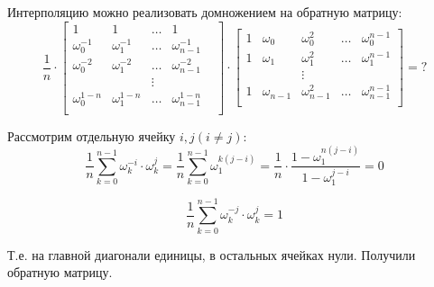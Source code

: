 Интерполяцию можно реализовать домножением на обратную матрицу:
\[
    \frac{1}{n}
    \cdot
    \begin{bmatrix}
        1 & 1 & \ldots & 1 \\
        \omega_0^{-1} & \omega_1^{-1} & \ldots & \omega_{n - 1}^{-1} \\
        \omega_0^{-2} & \omega_1^{-2} & \ldots & \omega_{n - 1}^{-2} \\
        & & \vdots & & \\
        \omega_0^{1 - n} & \omega_1^{1 - n} & \ldots & \omega_{n - 1}^{1 - n} \\
    \end{bmatrix}
    \cdot
    \begin{bmatrix}
        1 & \omega_0 & \omega_0^2 & \ldots & \omega_0^{n - 1} \\
        1 & \omega_1 & \omega_1^2 & \ldots & \omega_1^{n - 1} \\
        & & \vdots & & \\
        1 & \omega_{n - 1} & \omega_{n - 1}^2 & \ldots & \omega_{n - 1}^{n - 1} \\
    \end{bmatrix}
    = ?
\]

Рассмотрим отдельную ячейку $i, j (i \ne j)$:
\[
    \frac{1}{n}
    \sum_{k=0}^{n - 1}
    \omega_k^{-i}
    \cdot
    \omega_k^j
    =
    \frac{1}{n}
    \sum_{k=0}^{n - 1}
    \omega_1^{k(j - i)}
    =
    \frac{1}{n}
    \cdot
    \frac{1 - \omega_1^{n(j - i)}}{1 - \omega_1^{j - i}}
    =
    0
\]

\[
    \frac{1}{n}
    \sum_{k=0}^{n - 1}
    \omega_k^{-j}
    \cdot
    \omega_k^j
    =
    1
\]

Т.е. на главной диагонали единицы,
в остальных ячейках нули.
Получили обратную матрицу.
